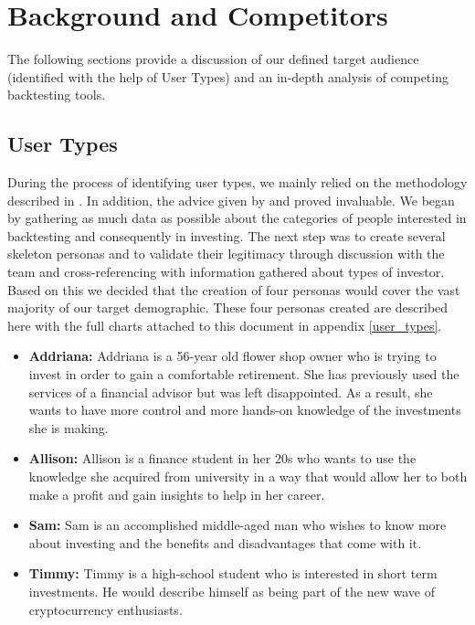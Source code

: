 \documentclass[main.tex]{subfiles}
\begin{document}
\section{Background and Competitors}

The following sections provide a discussion of our defined target audience (identified with the help of User Types) and an in-depth analysis of competing backtesting tools.

\subsection{User Types}

During the process of identifying user types, we mainly relied on the methodology described in \cite{pathy}. In addition, the advice given by \cite{uiux_fundation} and \cite{user_types_interaction_design_fundation} proved invaluable. We began by gathering as much data as possible about the categories of people interested in backtesting and consequently in investing. The next step was to create several skeleton personas \cite{personas} and to validate their legitimacy through discussion with the team and cross-referencing with information gathered about types of investor. Based on this we decided that the creation of four personas would cover the vast majority of our target demographic.
These four personas created are described here with the full charts attached to this document in appendix \ref{user_types}.
\begin{itemize}
\item \textbf{Addriana: }Addriana is a 56-year old flower shop owner who is trying to invest in order to gain a comfortable retirement. She has previously used the services of a financial advisor but was left disappointed. As a result, she wants to have more control and more hands-on knowledge of the investments she is making.
\item \textbf{Allison: }Allison is a finance student in her 20s who wants to use the knowledge she acquired from university in a way that would allow her to both make a profit and gain insights to help in her career.
\item\textbf{Sam: }Sam is an accomplished middle-aged man who wishes to know more about investing and the benefits and disadvantages that come with it. 
\item\textbf{Timmy: }Timmy is a high-school student who is interested in short term investments. He would describe himself as being part of the new wave of cryptocurrency enthusiasts.
\end{itemize}
\end{document}
